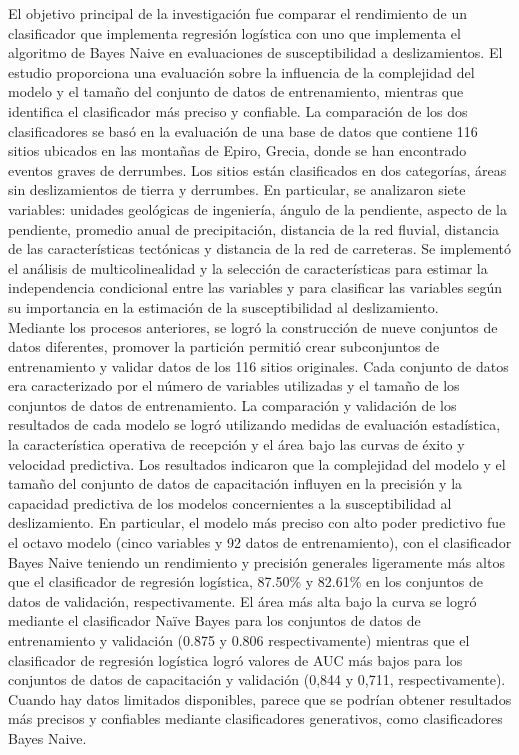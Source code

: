 El objetivo principal de la investigación fue comparar el rendimiento de un clasificador que implementa regresión logística con uno que implementa el algoritmo de Bayes Naive en evaluaciones de susceptibilidad a deslizamientos. El estudio proporciona una evaluación sobre la influencia de la complejidad del modelo y el tamaño del conjunto de datos de entrenamiento, mientras que identifica el clasificador más preciso y confiable. La comparación de los dos clasificadores se basó en la evaluación de una base de datos que contiene 116 sitios ubicados en las montañas de Epiro, Grecia, donde se han encontrado eventos graves de derrumbes. Los sitios están clasificados en dos categorías, áreas sin deslizamientos de tierra y derrumbes. En particular, se analizaron siete variables: unidades geológicas de ingeniería, ángulo de la pendiente, aspecto de la pendiente, promedio anual de precipitación, distancia de la red fluvial, distancia de las características tectónicas y distancia de la red de carreteras. Se implementó el análisis de multicolinealidad y la selección de características para estimar la independencia condicional entre las variables y para clasificar las variables según su importancia en la estimación de la susceptibilidad al deslizamiento.\\

Mediante los procesos anteriores, se logró la construcción de nueve conjuntos de datos diferentes, promover la partición permitió crear subconjuntos de entrenamiento y validar datos de los 116 sitios originales. Cada conjunto de datos era caracterizado por el número de variables utilizadas y el tamaño de los conjuntos de datos de entrenamiento. La comparación y validación de los resultados de cada modelo se logró utilizando medidas de evaluación estadística, la característica operativa de recepción y el área bajo las curvas de éxito y velocidad predictiva. Los resultados indicaron que la complejidad del modelo y el tamaño del conjunto de datos de capacitación influyen en la precisión y la capacidad predictiva de los modelos concernientes a la susceptibilidad al deslizamiento. En particular, el modelo más preciso con alto poder predictivo fue el octavo modelo (cinco variables y 92 datos de entrenamiento), con el clasificador Bayes Naive teniendo un rendimiento y precisión generales ligeramente más altos que el clasificador de regresión logística, 87.50\% y 82.61\% en los conjuntos de datos de validación, respectivamente. El área más alta bajo la curva se logró mediante el clasificador Naïve Bayes para los conjuntos de datos de entrenamiento y validación (0.875 y 0.806 respectivamente) mientras que el clasificador de regresión logística logró valores de AUC más bajos para los conjuntos de datos de capacitación y validación (0,844 y 0,711, respectivamente). Cuando hay datos limitados disponibles, parece que se podrían obtener resultados más precisos y confiables mediante clasificadores generativos, como clasificadores Bayes Naive. 

